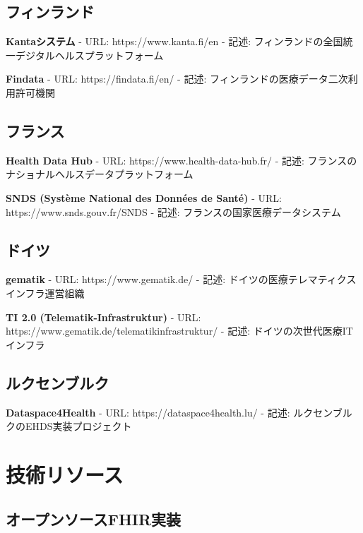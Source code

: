 \documentclass[
  a4paper,
  a4paper,
  11pt]{ltjsbook}
\begin{document}
\subsection{フィンランド}\label{ux30d5ux30a3ux30f3ux30e9ux30f3ux30c9}

\textbf{Kantaシステム} - URL: https://www.kanta.fi/en - 記述:
フィンランドの全国統一デジタルヘルスプラットフォーム

\textbf{Findata} - URL: https://findata.fi/en/ - 記述:
フィンランドの医療データ二次利用許可機関

\subsection{フランス}\label{ux30d5ux30e9ux30f3ux30b9}

\textbf{Health Data Hub} - URL: https://www.health-data-hub.fr/ - 記述:
フランスのナショナルヘルスデータプラットフォーム

\textbf{SNDS (Système National des Données de Santé)} - URL:
https://www.snds.gouv.fr/SNDS - 記述: フランスの国家医療データシステム

\subsection{ドイツ}\label{ux30c9ux30a4ux30c4}

\textbf{gematik} - URL: https://www.gematik.de/ - 記述:
ドイツの医療テレマティクスインフラ運営組織

\textbf{TI 2.0 (Telematik-Infrastruktur)} - URL:
https://www.gematik.de/telematikinfrastruktur/ - 記述:
ドイツの次世代医療ITインフラ

\subsection{ルクセンブルク}\label{ux30ebux30afux30bbux30f3ux30d6ux30ebux30af}

\textbf{Dataspace4Health} - URL: https://dataspace4health.lu/ - 記述:
ルクセンブルクのEHDS実装プロジェクト

\section{技術リソース}\label{ux6280ux8853ux30eaux30bdux30fcux30b9}

\subsection{オープンソースFHIR実装}\label{ux30aaux30fcux30d7ux30f3ux30bdux30fcux30b9fhirux5b9fux88c5}
\end{document}
